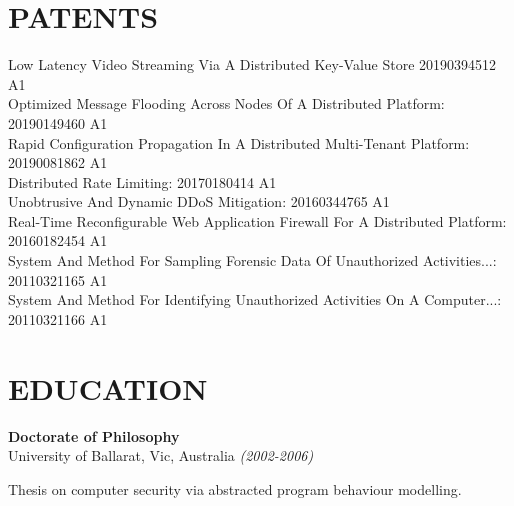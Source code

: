 \documentclass[margin]{res}
\begin{document}
\begin{resume}



\section{PATENTS}
Low Latency Video Streaming Via A Distributed Key-Value Store 20190394512 A1\\
Optimized Message Flooding Across Nodes Of A Distributed Platform: 20190149460 A1\\
Rapid Configuration Propagation In A Distributed Multi-Tenant Platform: 20190081862 A1\\
Distributed Rate Limiting: 20170180414 A1\\
Unobtrusive And Dynamic DDoS Mitigation: 20160344765 A1\\
Real-Time Reconfigurable Web Application Firewall For A Distributed Platform: 20160182454 A1\\
System And Method For Sampling Forensic Data Of Unauthorized Activities...: 20110321165 A1\\
System And Method For Identifying Unauthorized Activities On A Computer...: 20110321166 A1
 
\section{EDUCATION}

{\bf Doctorate of Philosophy} \\
University of Ballarat, Vic, Australia {\em (2002-2006)}
\begin{list}{}{\leftmargin=1.5em \topsep=5pt \partopsep=0pt \parsep=2.5pt}
  \item Thesis on computer security via abstracted program behaviour modelling.
\end{list}


\end{resume}
\end{document}

